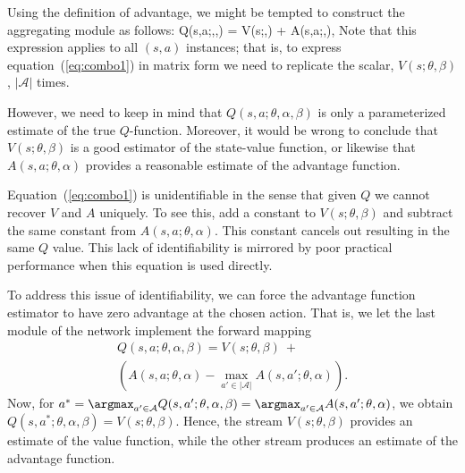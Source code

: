 Using the definition of advantage, we might be tempted to construct the aggregating module as follows:
\be
Q(s,a;\theta,\alpha,\beta) =  {V}(s;\theta,\beta) + {A}(s,a;\theta,\alpha),
\label{eq:combo1}
\ee
Note that this expression applies to all $(s,a)$ instances; that is, to express equation~(\ref{eq:combo1}) in matrix form we need to replicate the scalar, ${V}(s;\theta,\beta)$, $|\mathcal{A}|$ times.

However, we need to keep in mind that $Q(s,a;\theta,\alpha,\beta)$ is only a parameterized estimate of the true $Q$-function. Moreover, it would be wrong to conclude
that ${V}(s;\theta,\beta)$ is a good estimator of the state-value function, or likewise that ${A}(s,a;\theta,\alpha)$ provides a reasonable estimate of the advantage function. 

Equation~(\ref{eq:combo1}) is unidentifiable in the sense that given $Q$ we cannot recover ${V}$ and ${A}$ uniquely. To see this, add a constant to ${V}(s;\theta,\beta)$ and subtract the same constant from ${A}(s,a;\theta,\alpha)$. This constant cancels out resulting in the same $Q$ value. 
This lack of identifiability is mirrored by poor practical performance when this equation is used directly.

To address this issue of identifiability, we can force the advantage function estimator to have zero advantage at the chosen action. That is, we let the last module of the network implement the forward mapping
\begin{multline}
Q(s,a;\theta,\alpha,\beta) =  {V}(s;\theta,\beta)~+\\
\left({A}(s,a;\theta,\alpha) - \max_{a' \in |\mathcal{A}|}  {A}(s, a' ;\theta,\alpha) \right).
\label{eq:combo3}
\end{multline}
Now, for $a^* = \argmax_{a' \in \mathcal{A}} Q(s,a';\theta,\alpha,\beta) = \argmax_{a' \in \mathcal{A}} A(s,a';\theta,\alpha)$, we obtain $Q(s,a^*;\theta,\alpha,\beta) =  {V}(s;\theta,\beta)$. Hence, the stream ${V}(s;\theta,\beta)$ provides an estimate of the value function, while the other stream produces an estimate of the advantage function.

